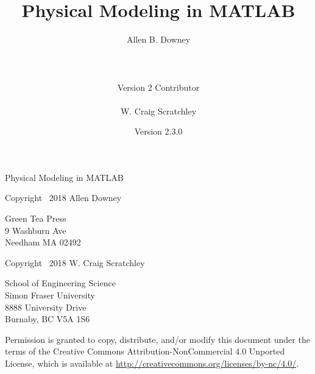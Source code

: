 \documentclass[
]{book}
\numberwithin{Answer}{chapter}
\numberwithin{Exercise}{chapter}
\newcommand{\myreg}{\textsuperscript{{\tiny \textregistered}}}
\newcommand{\thetitle}{Physical Modeling in MATLAB\myreg}
\newcommand{\theversion}{2.3.0}
\begin{document}
\frontmatter

\title {\thetitle}
\author {Allen B. Downey\\
\\
\\
\\
Version 2 Contributor\\
\\
W. Craig Scratchley\\}
\date {Version \theversion}


\maketitle


\vspace{2in}

\begin{center}
    {\Large \thetitle}
\end{center}

\vspace{21em}

Copyright \textcopyright \, 2018 Allen Downey

\vspace{0.5em}

\begin{flushleft}
Green Tea Press       \\
9 Washburn Ave \\
Needham MA 02492
\end{flushleft}

\vspace{0.5em}

Copyright \textcopyright \, 2018 W. Craig Scratchley

\vspace{0.5em}

\begin{flushleft}
School of Engineering Science\\
Simon Fraser University\\
8888 University Drive\\
Burnaby, BC V5A 1S6
\end{flushleft}

\vspace{2em}

Permission is granted to copy, distribute, and/or modify this document
under the terms of the Creative Commons Attribution-NonCommercial 4.0 Unported License, which is available at \url{http://creativecommons.org/licenses/by-nc/4.0/}.
\end{document}
